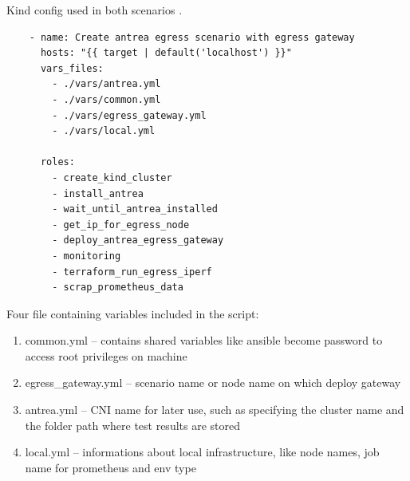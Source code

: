 \begin{listing}[H]
  \centering
  \caption{Kind config used in both scenarios \cite{KindConfig}.}
  \begin{verbatim}
    - name: Create antrea egress scenario with egress gateway
      hosts: "{{ target | default('localhost') }}"
      vars_files:
        - ./vars/antrea.yml
        - ./vars/common.yml
        - ./vars/egress_gateway.yml
        - ./vars/local.yml

      roles:
        - create_kind_cluster
        - install_antrea
        - wait_until_antrea_installed
        - get_ip_for_egress_node
        - deploy_antrea_egress_gateway
        - monitoring
        - terraform_run_egress_iperf
        - scrap_prometheus_data
  \end{verbatim}
  \label{lst:antreaEgressPlaybook}
\end{listing}

Four file containing variables included in the script:
\begin{enumerate}
  \item common.yml -- contains shared variables like ansible become password to access root privileges on machine
  \item egress\_gateway.yml -- scenario name or node name on which deploy gateway
  \item antrea.yml -- CNI name for later use, such as specifying the cluster name and the folder path where test results are stored
  \item local.yml -- informations about local infrastructure, like node names, job name for prometheus and env type
\end{enumerate}

